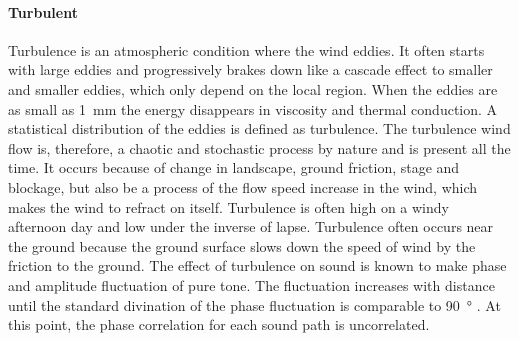 \paragraph{Turbulent} Turbulence is an atmospheric condition where the wind eddies. It often starts with large eddies and progressively brakes down like a cascade effect to smaller and smaller eddies, which only depend on the local region. When the eddies are as small as \SI{1}{\milli\meter} the energy disappears in viscosity and thermal conduction. A statistical distribution of the eddies is defined as turbulence. The turbulence wind flow is, therefore, a chaotic and stochastic process by nature and is present all the time. It occurs because of change in landscape, ground friction, stage and blockage, but also be a process of the flow speed increase in the wind, which makes the wind to refract on itself. Turbulence is often high on a windy afternoon day and low under the inverse of lapse. Turbulence often occurs near the ground because the ground surface slows down the speed of wind by the friction to the ground. The effect of turbulence on sound is known to make phase and amplitude fluctuation of pure tone. The fluctuation increases with distance until the standard divination of the phase fluctuation is comparable to \SI{90}{\degree} \citep{review_of_sound}. At this point, the phase correlation for each sound path is uncorrelated.









